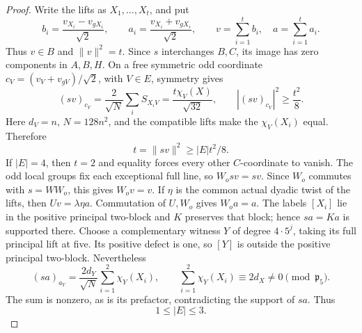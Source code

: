 \documentclass[11pt,a4paper]{article}
\numberwithin{equation}{section}
\begin{document}
\begin{proof}
Write the lifts as $X_1,\ldots,X_t$, and put
\[
 b_i=\frac{v_{X_i}-v_{gX_i}}{\sqrt2},\qquad
 a_i=\frac{v_{X_i}+v_{gX_i}}{\sqrt2},\qquad
 v=\sum_{i=1}^t b_i,\quad a=\sum_{i=1}^t a_i.
\]
Thus $v\in B$ and $\|v\|^2=t$. Since $s$ interchanges $B,C$, its
image has zero components in $A,B,H$. On a free symmetric odd
coordinate $c_V=(v_V+v_{gV})/\sqrt2$, with $V\in E$, symmetry gives
\[
 (sv)_{c_V}=\frac{2}{\sqrt N}\sum_i S_{X_iV}
           =\frac{t\chi_V(X)}{\sqrt{32}},\qquad
 |(sv)_{c_V}|^2\ge\frac{t^2}{8}.
\]
Here $d_V=n$, $N=128n^2$, and the compatible lifts make the
$\chi_V(X_i)$ equal. Therefore
\[
             t=\|sv\|^2\ge |E|t^2/8.
\]
If $|E|=4$, then $t=2$ and equality forces every other $C$-coordinate
to vanish. The odd local groups fix each exceptional full line, so
$W_o sv=sv$. Since $W_o$ commutes with $s=WW_o$, this gives
$W_ov=v$. If $\eta$ is the common actual dyadic twist of the lifts,
then $Uv=\lambda\eta a$. Commutation of $U,W_o$ gives $W_oa=a$.
The labels $[X_i]$ lie in the positive principal two-block and $K$
preserves that block; hence $sa=Ka$ is supported there.
Choose a complementary witness $Y$ of degree $4\cdot5^j$, taking
its full principal lift at five. Its positive defect is one, so
$[Y]$ is outside the positive principal two-block. Nevertheless
\[
 (sa)_{a_Y}=\frac{2d_Y}{\sqrt N}\sum_{i=1}^2\chi_Y(X_i),
 \qquad
 \sum_{i=1}^2\chi_Y(X_i)\equiv2d_X\ne0\pmod{\mathfrak p_5}.
\]
The sum is nonzero, as is its prefactor, contradicting the support
of $sa$. Thus
\[
                              1\le|E|\le3.
\]


\end{proof}
\end{document}
